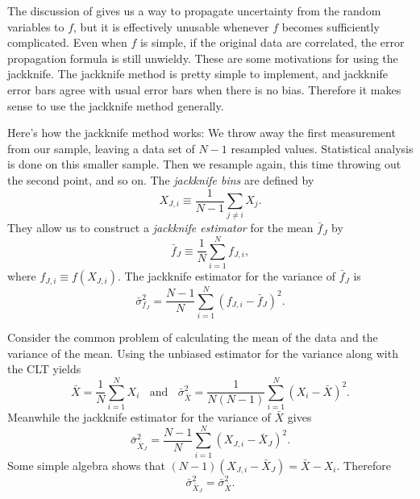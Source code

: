 The discussion of  gives us a way to propagate 
uncertainty from the random variables to $f$, but it is effectively 
unusable whenever $f$ becomes sufficiently complicated. 
Even when $f$ is simple, if the original data are correlated, the 
error propagation formula  is still 
unwieldy. These are some motivations for using the jackknife.
The jackknife method is pretty simple to implement, and jackknife error 
bars agree with usual error bars when there is no bias.
Therefore it makes sense to use the jackknife method generally. 

Here's how the jackknife method works: We throw away the first measurement 
from our sample, leaving a data set of $N-1$ resampled values. Statistical
analysis is done on this smaller sample. Then we resample again, this time
throwing out the second point, and so on.
The {\it jackknife bins} are defined by
\begin{equation}
  X_{J,i}\equiv\frac{1}{N-1}\sum_{j\neq i}X_j.
\end{equation}
They allow us to construct a {\it jackknife estimator}
 for the mean $\bar{f}_J$ by
\begin{equation}\label{eq:jackmean}
  \bar{f}_J\equiv\frac{1}{N}\sum_{i=1}^N f_{J,i},
\end{equation}
where $f_{J,i}\equiv f(X_{J,i})$. The jackknife estimator for the 
variance of $\bar{f}_J$ is
\begin{equation}\label{eq:jackvar}
  \bar\sigma^2_{f_J}=\frac{N-1}{N}\sum_{i=1}^N(f_{J,i}-\bar{f}_J)^2.
\end{equation}
\begin{example*}{}{}
  Consider the common problem of calculating the mean of the data and
  the variance of the mean. Using the unbiased estimator for the variance
  along with the CLT yields
  \begin{equation}
    \bar{X}=\frac{1}{N}\sum_{i=1}^N X_i~~~~\text{and}~~~~
     \bar{\sigma}^2_{\bar{X}}=\frac{1}{N(N-1)}\sum_{i=1}^N(X_i-\bar{X})^2.
  \end{equation}
  Meanwhile the jackknife estimator for the variance of $\bar{X}$ gives
  \begin{equation}
    \bar\sigma_{\bar{X}_J}^2=\frac{N-1}{N}\sum_{i=1}^N(X_{J,i}-\bar{X}_J)^2.
  \end{equation}
  Some simple algebra shows that $(N-1)(X_{J,i}-\bar{X}_J)=\bar{X}-X_i$.
  Therefore
  \begin{equation}
    \bar\sigma_{\bar{X}_J}^2=\bar{\sigma}^2_{\bar{X}}.
  \end{equation}
\end{example*}

